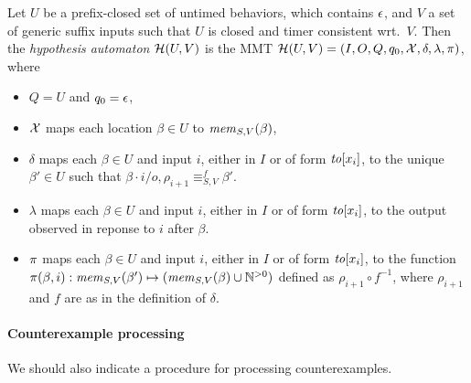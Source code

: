 \begin{definition}
  Let $U$ be a prefix-closed set
  of untimed behaviors, which contains $\emptyword$,
  and $V$ a set of generic suffix inputs such that
$U$ is closed and timer consistent wrt.\ $V$. Then the
{\em hypothesis automaton} $\hypoof UV$ is the MMT
$\hypoof UV = (I, O, Q, q_0, \vars, \delta, \lambda, \remap)$, where
\begin{itemize}
\item $Q = U$ and $q_0 = \emptyword$,
\item $\vars$ maps each location $\beta\in U$ to $\getmemorable{S}{\beta}{V}$,
\item $\delta$ maps each $\beta \in U$ and input
  $i$, either in $I$ or of form $\toevent{x_i}$,
  to the unique $\beta' \in U$ such that
$\beta \cdot i/o,\rho_{i+1} \equiv_{S,V}^f \beta'$.
\item $\lambda$ maps each $\beta \in U$ and input
  $i$, either in $I$ or of form $\toevent{x_i}$, to the output observed in
  reponse to $i$ after $\beta$.
\item $\remap$
 maps each $\beta \in U$ and input
$i$, either in $I$ or of form $\toevent{x_i}$, to the function
  $\remap(\beta,i):\getmemorable{S}{\beta'}{V} \mapsto (\getmemorable{S}{\beta}{V} \cup \natplus)$ defined as $\rho_{i+1} \circ f^{-1}$, where $\rho_{i+1}$ and $f$
  are as in the definition of $\delta$.
\end{itemize}
\end{definition}

\paragraph{Counterexample processing}
We should also indicate a procedure for processing counterexamples.
